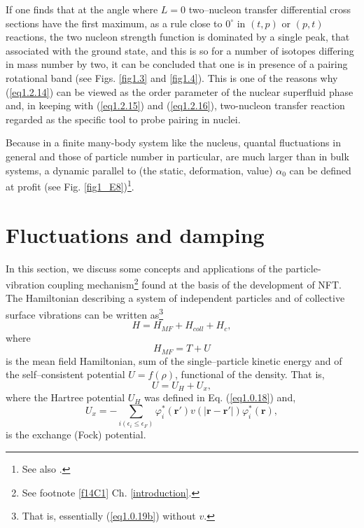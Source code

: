 If one finds that at the angle where $L=0$ two--nucleon transfer differential cross sections have the first maximum, as a rule close to $0^\circ$ in $(t,p)$ or $(p,t)$ reactions, the two nucleon strength function is dominated by a single peak, that associated with the ground state, and this is so for a number of isotopes differing in mass number by two, it can be concluded that one is in presence of a pairing rotational band (see Figs. \ref{fig1.3} and \ref{fig1.4}). This is one of the reasons why (\ref{eq1.2.14}) can be viewed as the order parameter of the nuclear superfluid phase and, in keeping with (\ref{eq1.2.15}) and (\ref{eq1.2.16}), two-nucleon transfer reaction regarded as the specific tool to probe pairing in nuclei.

Because in a finite many-body system like the nucleus, quantal fluctuations in general and those of particle number in particular, are much larger than in bulk systems, a dynamic parallel to (the static, deformation, value) $\alpha_0$ can be defined at profit (see Fig. \ref{fig1_E8})\footnote{See also \cite{Potel:17}.}. 
\section{Fluctuations and damping}\label{appintroD}
In this section, we discuss some concepts and applications of the particle-vibration coupling mechanism\footnote{See footnote \ref{f14C1} Ch. \ref{introduction}.} found at the basis of the development of NFT.
The Hamiltonian describing a system of independent particles and of collective surface vibrations can be written as\footnote{That is, essentially (\ref{eq1.0.19b}) without $v$.} 
\begin{equation}\label{eqn:30}
H = H_{MF}  + H_{coll} + H_{c} ,
\end{equation}
where
\begin{equation}\label{eq1.3.2}
H_{MF}=T+U
\end{equation}
is the mean field Hamiltonian, sum of the single--particle kinetic energy and of the self--consistent potential $U=f(\rho)$, functional of the  density. That is,
\begin{equation}
U=U_H+U_x,
\end{equation}
where the Hartree potential $U_H$ was defined in Eq. (\ref{eq1.0.18}) and,
\begin{equation}\label{eq2.3.4}
U_x=-\sum_{i(\epsilon_i\leq\epsilon_F)}\varphi_i^*(\mathbf r')v(|\mathbf r- \mathbf r'|)\varphi_i^*(\mathbf r),
\end{equation}
is the exchange (Fock) potential. 



